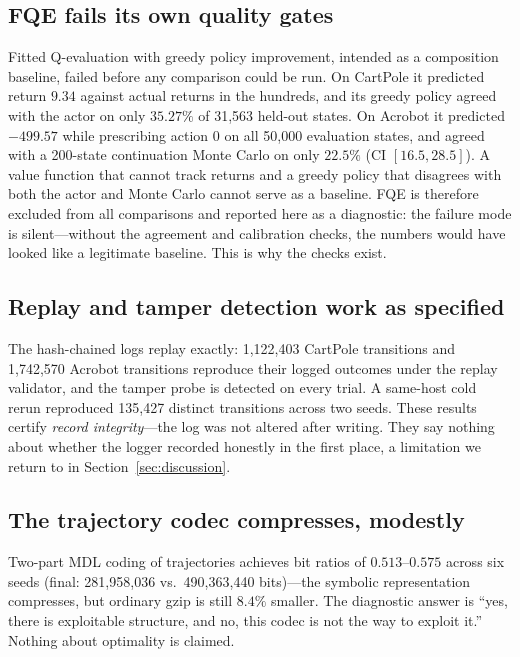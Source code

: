 \documentclass[11pt]{article}
\begin{document}
\subsection{FQE fails its own quality gates}
\label{sec:fqe}

Fitted Q-evaluation with greedy policy improvement, intended as a composition baseline, failed before any comparison could be run. On CartPole it predicted return $9.34$ against actual returns in the hundreds, and its greedy policy agreed with the actor on only $35.27\%$ of 31,563 held-out states. On Acrobot it predicted $-499.57$ while prescribing action 0 on all 50,000 evaluation states, and agreed with a 200-state continuation Monte Carlo on only $22.5\%$ (CI $[16.5, 28.5]$). A value function that cannot track returns and a greedy policy that disagrees with both the actor and Monte Carlo cannot serve as a baseline. FQE is therefore excluded from all comparisons and reported here as a diagnostic: the failure mode is silent---without the agreement and calibration checks, the numbers would have looked like a legitimate baseline. This is why the checks exist.

\subsection{Replay and tamper detection work as specified}

The hash-chained logs replay exactly: 1,122,403 CartPole transitions and 1,742,570 Acrobot transitions reproduce their logged outcomes under the replay validator, and the tamper probe is detected on every trial. A same-host cold rerun reproduced 135,427 distinct transitions across two seeds. These results certify \textit{record integrity}---the log was not altered after writing. They say nothing about whether the logger recorded honestly in the first place, a limitation we return to in Section~\ref{sec:discussion}.

\subsection{The trajectory codec compresses, modestly}

Two-part MDL coding of trajectories achieves bit ratios of $0.513$--$0.575$ across six seeds (final: 281,958,036 vs.\ 490,363,440 bits)---the symbolic representation compresses, but ordinary gzip is still $8.4\%$ smaller. The diagnostic answer is ``yes, there is exploitable structure, and no, this codec is not the way to exploit it.'' Nothing about optimality is claimed.
\end{document}
